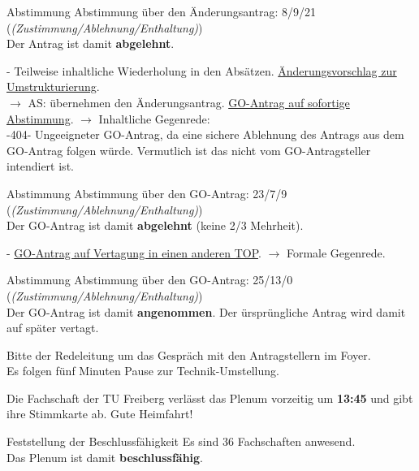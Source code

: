     \begin{danger}{Abstimmung}
      Abstimmung über den Änderungsantrag: 8/9/21 (\textit{(Zustimmung/Ablehnung/Enthaltung)}) \\
      Der Antrag ist damit \textbf{abgelehnt}.
    \end{danger}

    \begin{outline}
      - Teilweise inhaltliche Wiederholung in den Absätzen. \underline{Änderungsvorschlag zur Umstrukturierung}. \\
      $\rightarrow$ AS: übernehmen den Änderungsantrag.
      \1 \underline{GO-Antrag auf sofortige Abstimmung}. $\rightarrow$ Inhaltliche Gegenrede: \\
        -404- Ungeeigneter GO-Antrag, da eine sichere Ablehnung des Antrags aus dem GO-Antrag folgen würde. Vermutlich ist das nicht vom GO-Antragsteller intendiert ist.
    \end{outline}

    \begin{danger}{Abstimmung}
      Abstimmung über den GO-Antrag: 23/7/9 (\textit{(Zustimmung/Ablehnung/Enthaltung)}) \\
      Der GO-Antrag ist damit \textbf{abgelehnt} (keine 2/3 Mehrheit).
    \end{danger}

    \begin{outline}
      - \underline{GO-Antrag auf Vertagung in einen anderen TOP}. $\rightarrow$ Formale Gegenrede.
    \end{outline}

    \begin{success}{Abstimmung}
      Abstimmung über den GO-Antrag: 25/13/0 (\textit{(Zustimmung/Ablehnung/Enthaltung)}) \\
      Der GO-Antrag ist damit \textbf{angenommen}. Der ürsprüngliche Antrag wird damit auf später vertagt.
    \end{success}

    Bitte der Redeleitung um das Gespräch mit den Antragstellern im Foyer. \\
    Es folgen fünf Minuten Pause zur Technik-Umstellung.

    \begin{info}{}
      Die Fachschaft der TU Freiberg verlässt das Plenum vorzeitig um \textbf{13:45} und gibt ihre Stimmkarte ab. Gute Heimfahrt!
    \end{info}

    \begin{success}{Feststellung der Beschlussfähigkeit}
      Es sind 36 Fachschaften anwesend. \\
      Das Plenum ist damit \textbf{beschlussfähig}.
    \end{success}


